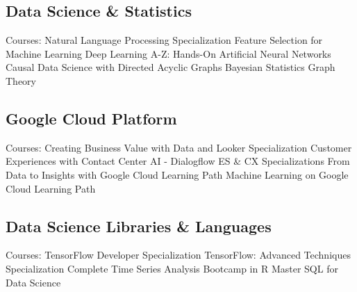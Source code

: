 \documentclass[letterpaper]{deedy-resume_sm}
\begin{document}
\subsection{Data Science \& Statistics}
Courses: Natural Language Processing Specialization \textbullet{} Feature Selection for Machine Learning \textbullet{} Deep Learning A-Z: Hands-On Artificial Neural Networks \textbullet{} Causal Data Science with Directed Acyclic Graphs \textbullet{} Bayesian Statistics \textbullet{} Graph Theory

\subsection{Google Cloud Platform}
Courses: Creating Business Value with Data and Looker Specialization \textbullet{} Customer Experiences with Contact Center AI - Dialogflow ES \& CX Specializations \textbullet{} From Data to Insights with Google Cloud Learning Path \textbullet{} Machine Learning on Google Cloud Learning Path

\subsection{Data Science Libraries \& Languages}
Courses: TensorFlow Developer Specialization \textbullet{} TensorFlow: Advanced Techniques Specialization \textbullet{} Complete Time Series Analysis Bootcamp in R \textbullet{} Master SQL for Data Science
\end{document}
